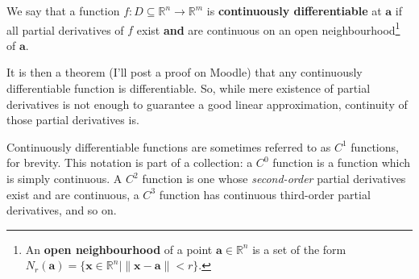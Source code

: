 \documentclass[letterpaper,12pt]{article}
\newcommand{\R}{\mathbb{R}}
\begin{document}
\pagebreak

 We say that a function $f:D\subseteq \R^n\to \R^m$ is {\bf continuously differentiable} at $\mathbf{a}$ if all partial derivatives of $f$ exist {\bf and} are continuous on an open neighbourhood\footnote{An {\bf open neighbourhood} of a point $\mathbf{a}\in\R^n$ is a set of the form $N_r(\mathbf{a}) = \{\mathbf{x}\in\R^n | \lVert\mathbf{x}-\mathbf{a}\rVert<r\}$.} of $\mathbf{a}$. 

\medskip

It is then a theorem (I'll post a proof on Moodle) that any continuously differentiable function is differentiable. So, while mere existence of partial derivatives is not enough to guarantee a good linear approximation, continuity of those partial derivatives is.

Continuously differentiable functions are sometimes referred to as $C^1$ functions, for brevity. This notation is part of a collection: a $C^0$ function is a function which is simply continuous. A $C^2$ function is one whose {\em second-order} partial derivatives exist and are continuous, a $C^3$ function has continuous third-order partial derivatives, and so on.
\end{document}
